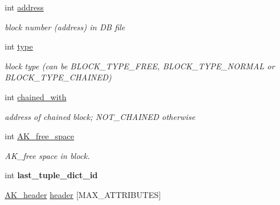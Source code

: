 \begin{DoxyCompactItemize}
\item 
\hypertarget{structAK__block_a72691b8b4db638181adadd02c0a9c6af}{int \hyperlink{structAK__block_a72691b8b4db638181adadd02c0a9c6af}{address}}\label{structAK__block_a72691b8b4db638181adadd02c0a9c6af}

\begin{DoxyCompactList}\small\item\em block number (address) in D\+B file \end{DoxyCompactList}\item 
\hypertarget{structAK__block_a7bc611836789dc2b045d768432efe184}{int \hyperlink{structAK__block_a7bc611836789dc2b045d768432efe184}{type}}\label{structAK__block_a7bc611836789dc2b045d768432efe184}

\begin{DoxyCompactList}\small\item\em block type (can be B\+L\+O\+C\+K\+\_\+\+T\+Y\+P\+E\+\_\+\+F\+R\+E\+E, B\+L\+O\+C\+K\+\_\+\+T\+Y\+P\+E\+\_\+\+N\+O\+R\+M\+A\+L or B\+L\+O\+C\+K\+\_\+\+T\+Y\+P\+E\+\_\+\+C\+H\+A\+I\+N\+E\+D) \end{DoxyCompactList}\item 
\hypertarget{structAK__block_a56692ada02b24c08e3be44da8504ad9b}{int \hyperlink{structAK__block_a56692ada02b24c08e3be44da8504ad9b}{chained\+\_\+with}}\label{structAK__block_a56692ada02b24c08e3be44da8504ad9b}

\begin{DoxyCompactList}\small\item\em address of chained block; N\+O\+T\+\_\+\+C\+H\+A\+I\+N\+E\+D otherwise \end{DoxyCompactList}\item 
\hypertarget{structAK__block_a5f3394eebe71ffc105b8f52af2155102}{int \hyperlink{structAK__block_a5f3394eebe71ffc105b8f52af2155102}{A\+K\+\_\+free\+\_\+space}}\label{structAK__block_a5f3394eebe71ffc105b8f52af2155102}

\begin{DoxyCompactList}\small\item\em A\+K\+\_\+free space in block. \end{DoxyCompactList}\item 
\hypertarget{structAK__block_a6dcee13f6c5c80530ae1376e0f3a399f}{int {\bfseries last\+\_\+tuple\+\_\+dict\+\_\+id}}\label{structAK__block_a6dcee13f6c5c80530ae1376e0f3a399f}

\item 
\hypertarget{structAK__block_a291a49ea3dc9d972d3e1da46ba620903}{\hyperlink{structAK__header}{A\+K\+\_\+header} \hyperlink{structAK__block_a291a49ea3dc9d972d3e1da46ba620903}{header} \mbox{[}M\+A\+X\+\_\+\+A\+T\+T\+R\+I\+B\+U\+T\+E\+S\mbox{]}}\label{structAK__block_a291a49ea3dc9d972d3e1da46ba620903}


\end{DoxyCompactItemize}
